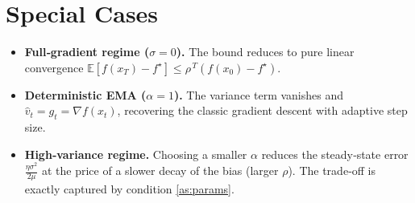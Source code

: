 \documentclass{article}
\newcommand{\E}{\mathbb{E}}
\begin{document}
\section*{Special Cases}
\begin{itemize}
\item \textbf{Full‑gradient regime ($\sigma=0$).}
  The bound reduces to pure linear convergence
  $\E[f(x_T)-f^\star]\le\rho^{\,T}(f(x_0)-f^\star)$.
\item \textbf{Deterministic EMA ($\alpha=1$).}
  The variance term vanishes and $\hat v_t=g_t=\nabla f(x_t)$,
  recovering the classic gradient descent with adaptive step size.
\item \textbf{High‑variance regime.}
  Choosing a smaller $\alpha$ reduces the steady‑state error
  $\frac{\eta\sigma^2}{2\mu}$ at the price of a slower decay of the bias
  (larger $\rho$).  The trade‑off is exactly captured by condition
  \ref{as:params}.
\end{itemize}
\end{document}

